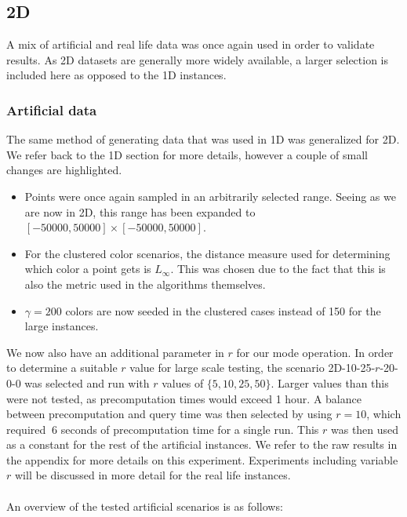 \documentclass{article}
\begin{document}
\subsection{2D}
A mix of artificial and real life data was once again used in order to validate
results. As 2D datasets are generally more widely available, a larger selection
is included here as opposed to the 1D instances. \subsubsection*{Artificial
    data} The same method of generating data that was used in 1D was generalized
for 2D. We refer back to the 1D section for more details, however a couple of
small changes are highlighted.
\begin{itemize}
    \item Points were once again sampled in an arbitrarily selected range. Seeing as we
          are now in 2D, this range has been expanded to $[-50000, 50000] \times [-50000,
                  50000]$.
    \item For the clustered color scenarios, the distance measure used for determining
          which color a point gets is $L_\infty$. This was chosen due to the fact that
          this is also the metric used in the algorithms themselves.
    \item $\gamma=200$ colors are now seeded in the clustered cases instead of 150 for the large instances.
\end{itemize}
We now also have an additional parameter in $r$ for our mode operation. In order to determine a suitable $r$ value for large scale testing, the scenario 2D-10-25-$r$-20-0-0 was selected and run with $r$ values of $\{ 5, 10, 25, 50 \}$. Larger values than this were not tested, as precomputation times would exceed 1 hour. A balance between precomputation and query time was then selected by using $r=10$, which required $~6$ seconds of precomputation time for a single run. This $r$ was then used as a constant for the rest of the artificial instances. We refer to the raw results in the appendix for more details on this experiment. Experiments including variable $r$ will be discussed in more detail for the real life instances. \\\\
An overview of the tested artificial scenarios is as follows: \\
\end{document}
